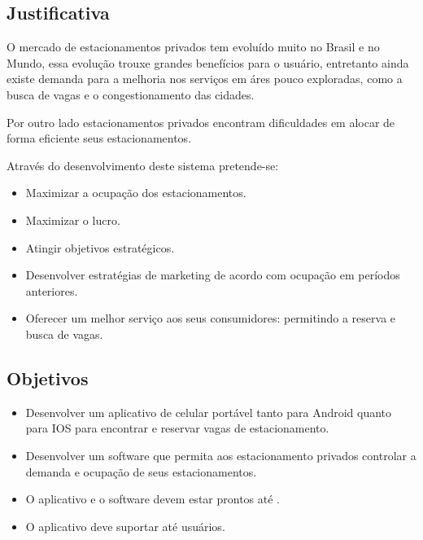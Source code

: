 
\subsection{Justificativa}

O mercado de estacionamentos privados tem evoluído muito no Brasil e no Mundo, essa evolução trouxe grandes benefícios para o usuário, entretanto ainda existe demanda para a melhoria nos serviços em áres pouco exploradas, como a busca de vagas e o congestionamento das cidades.

Por outro lado estacionamentos privados encontram dificuldades em alocar de forma eficiente seus estacionamentos.


Através do desenvolvimento deste sistema pretende-se:
\begin{itemize}
	\item Maximizar a ocupação dos estacionamentos.%
	\item Maximizar o lucro.
	\item Atingir objetivos estratégicos.
	\item Desenvolver estratégias de marketing de acordo com ocupação em períodos anteriores.
	\item Oferecer um melhor serviço aos seus consumidores: permitindo a reserva e busca de vagas.
\end{itemize}

\subsection{Objetivos}


\begin{itemize}
	\item Desenvolver um aplicativo de celular portável tanto para Android quanto para IOS para encontrar e reservar vagas de estacionamento.
	\item Desenvolver um software que permita aos estacionamento privados controlar a demanda e ocupação de seus estacionamentos.
	\item O aplicativo e o software devem estar prontos até \maximumDeadline.
	\item O aplicativo deve suportar até \minimumUsersAmount usuários.
\end{itemize}

